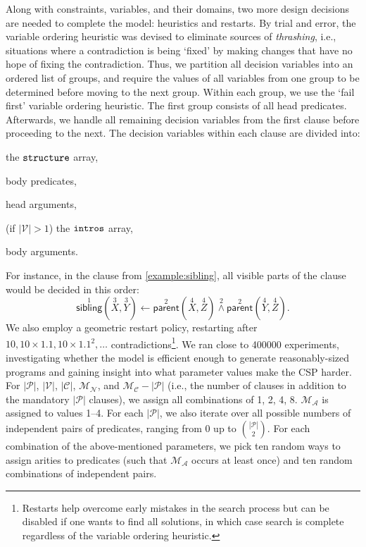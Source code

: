 \documentclass[runningheads]{llncs}
\newcommand{\variable}[1]{\texttt{\textup{#1}}}
\newcommand{\predicates}{\mathcal{P}}
\newcommand{\variables}{\mathcal{V}}
\newcommand{\constants}{\mathcal{C}}
\newcommand{\maxArity}{\mathcal{M}_{\mathcal{A}}}
\newcommand{\maxNumNodes}{\mathcal{M}_{\mathcal{N}}}
\newcommand{\maxNumClauses}{\mathcal{M}_{\mathcal{C}}}
\begin{document}
Along with constraints, variables, and their domains, two more design decisions
are needed to complete the model: heuristics and restarts. By trial and error,
the variable ordering heuristic was devised to eliminate sources of
\emph{thrashing}, i.e., situations where a contradiction is being `fixed' by
making changes that have no hope of fixing the contradiction. Thus, we partition
all decision variables into an ordered list of groups, and require the values of
all variables from one group to be determined before moving to the next group.
Within each group, we use the `fail first' variable ordering heuristic. The
first group consists of all head predicates. Afterwards, we handle all remaining
decision variables from the first clause before proceeding to the next. The
decision variables within each clause are divided into:
\begin{enumerate*}
\item the $\variable{structure}$ array,
\item body predicates,
\item head arguments,
\item (if $|\variables{}| > 1$) the $\variable{intros}$ array,
\item body arguments.
\end{enumerate*}
For instance, in the clause from \cref{example:sibling}, all visible parts of
the clause would be decided in this order:
\[
  \overset{1}{\mathsf{sibling}}(\overset{3}{X}, \overset{3}{Y}) \gets
  \overset{2}{\mathsf{parent}}(\overset{4}{X}, \overset{4}{Z})
  \overset{2}{\land} \overset{2}{\mathsf{parent}}(\overset{4}{Y},
  \overset{4}{Z}).
\]
We also employ a geometric restart policy, restarting after $10, 10 \times 1.1,
10 \times 1.1^2, \dots$ contradictions\footnote{Restarts help overcome early
  mistakes in the search process but can be disabled if one wants to find all
  solutions, in which case search is complete regardless of the variable
  ordering heuristic.}. We ran close to \num{400000} experiments, investigating
whether the model is efficient enough to generate reasonably-sized programs and
gaining insight into what parameter values make the CSP harder. For
$|\predicates{}|$, $|\variables{}|$, $|\constants{}|$, $\maxNumNodes{}$, and
$\maxNumClauses{} - |\predicates{}|$ (i.e., the number of clauses in addition to
the mandatory $|\predicates{}|$ clauses), we assign all combinations of 1, 2, 4,
8. $\maxArity{}$ is assigned to values 1--4. For each $|\predicates{}|$, we also
iterate over all possible numbers of independent pairs of predicates, ranging
from 0 up to $\binom{|\predicates{}|}{2}$. For each combination of the
above-mentioned parameters, we pick ten random ways to assign arities to
predicates (such that $\maxArity{}$ occurs at least once) and ten random
combinations of independent pairs.
\end{document}
